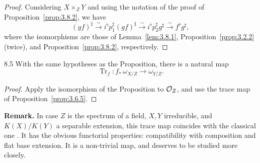 \begin{proof}
Considering $X\times_Z Y$ and using the notation of the proof of Proposition~\ref{prop:3.8.2}, we have
\[
(gf)^{\sharp} \xrightarrow{\sim} i^{\flat} p_1^{\sharp} (gf)^{\sharp} \xrightarrow{\sim} i^{\flat} p_2^{\sharp} g^{\sharp} \xrightarrow{\sim} f^{\flat} g^{\sharp},
\]
where the isomorphisms are those of Lemma~\ref{lem:3.8.1}, Proposition~\ref{prop:3.2.2} (twice), and Proposition~\ref{prop:3.8.2}, respectively.
\end{proof}

\begin{bookcorollary}{8.5}\label{cor:3.8.5}
With the same hypotheses as the Proposition, there is a natural map
\[
\operatorname{Tr}_f \colon f_*\,\omega_{X/Z} \longrightarrow \omega_{Y/Z}.
\]
\end{bookcorollary}

\begin{proof}
Apply the isomorphism of the Proposition to $\mathcal{O}_Z$, and use the trace map of Proposition~\ref{prop:3.6.5}.
\end{proof}

\textbf{Remark.}
In case $Z$ is the spectrum of a field, $X,Y$ irreducible, and $K(X)/K(Y)$ a separable extension, this trace map coincides with the classical one \cite[\nopp Ch.~VI, \S2]{3}. It has the obvious functorial properties: compatibility with composition and flat base extension. It is a non-trivial map, and deserves to be studied more closely.

